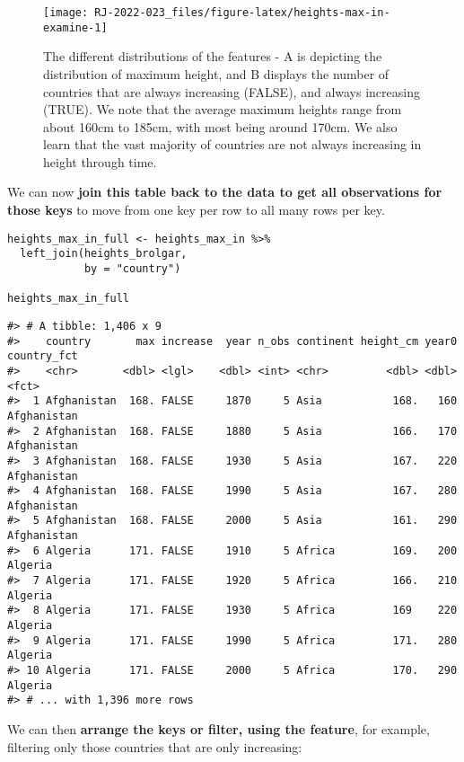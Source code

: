\begin{figure}

{\centering \texttt{[image: RJ-2022-023\_files/figure-latex/heights-max-in-examine-1]} 

}

\caption{The different distributions of the features - A is depicting the distribution of maximum height, and B displays the number of countries that are always increasing (FALSE), and always increasing (TRUE). We note that the average maximum heights range from about 160cm to 185cm, with most being around 170cm. We also learn that the vast majority of countries are not always increasing in height through time.}\label{fig:heights-max-in-examine}
\end{figure}

We can now \textbf{join this table back to the data to get all observations for those keys} to move from one key per row to all many rows per key.

\begin{verbatim}
heights_max_in_full <- heights_max_in %>% 
  left_join(heights_brolgar,
            by = "country")

heights_max_in_full
\end{verbatim}

\begin{verbatim}
#> # A tibble: 1,406 x 9
#>    country       max increase  year n_obs continent height_cm year0 country_fct
#>    <chr>       <dbl> <lgl>    <dbl> <int> <chr>         <dbl> <dbl> <fct>      
#>  1 Afghanistan  168. FALSE     1870     5 Asia           168.   160 Afghanistan
#>  2 Afghanistan  168. FALSE     1880     5 Asia           166.   170 Afghanistan
#>  3 Afghanistan  168. FALSE     1930     5 Asia           167.   220 Afghanistan
#>  4 Afghanistan  168. FALSE     1990     5 Asia           167.   280 Afghanistan
#>  5 Afghanistan  168. FALSE     2000     5 Asia           161.   290 Afghanistan
#>  6 Algeria      171. FALSE     1910     5 Africa         169.   200 Algeria    
#>  7 Algeria      171. FALSE     1920     5 Africa         166.   210 Algeria    
#>  8 Algeria      171. FALSE     1930     5 Africa         169    220 Algeria    
#>  9 Algeria      171. FALSE     1990     5 Africa         171.   280 Algeria    
#> 10 Algeria      171. FALSE     2000     5 Africa         170.   290 Algeria    
#> # ... with 1,396 more rows
\end{verbatim}

We can then \textbf{arrange the keys or filter, using the feature}, for example, filtering only those countries that are only increasing:

